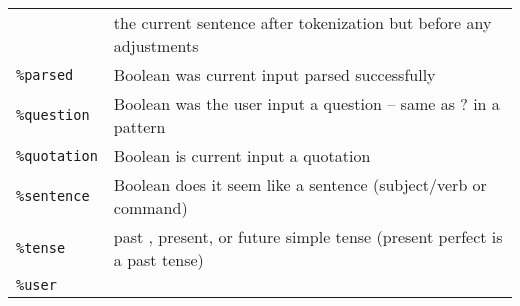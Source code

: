 \documentclass[]{article}
\begin{document}
\begin{longtable}[]{@{}ll@{}}
\begin{minipage}[t]{0.12\columnwidth}
\end{minipage} & \begin{minipage}[t]{0.10\columnwidth}\raggedright\strut
the current sentence after tokenization but before any adjustments\strut
\end{minipage}\tabularnewline
\begin{minipage}[t]{0.12\columnwidth}\raggedright\strut
\texttt{\%parsed}\strut
\end{minipage} & \begin{minipage}[t]{0.10\columnwidth}\raggedright\strut
Boolean was current input parsed successfully\strut
\end{minipage}\tabularnewline
\begin{minipage}[t]{0.12\columnwidth}\raggedright\strut
\texttt{\%question}\strut
\end{minipage} & \begin{minipage}[t]{0.10\columnwidth}\raggedright\strut
Boolean was the user input a question -- same as ? in a pattern\strut
\end{minipage}\tabularnewline
\begin{minipage}[t]{0.12\columnwidth}\raggedright\strut
\texttt{\%quotation}\strut
\end{minipage} & \begin{minipage}[t]{0.10\columnwidth}\raggedright\strut
Boolean is current input a quotation\strut
\end{minipage}\tabularnewline
\begin{minipage}[t]{0.12\columnwidth}\raggedright\strut
\texttt{\%sentence}\strut
\end{minipage} & \begin{minipage}[t]{0.10\columnwidth}\raggedright\strut
Boolean does it seem like a sentence (subject/verb or command)\strut
\end{minipage}\tabularnewline
\begin{minipage}[t]{0.12\columnwidth}\raggedright\strut
\texttt{\%tense}\strut
\end{minipage} & \begin{minipage}[t]{0.10\columnwidth}\raggedright\strut
past , present, or future simple tense (present perfect is a past
tense)\strut
\end{minipage}\tabularnewline
\begin{minipage}[t]{0.12\columnwidth}\raggedright\strut
\texttt{\%user}\strut
\end{minipage} & \begin{minipage}[t]{0.10\columnwidth}\raggedright\strut

\end{minipage}
\end{longtable}
\end{document}

